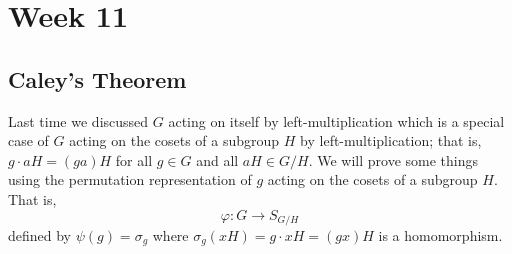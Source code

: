 \section{Week 11}

\subsection{Caley's Theorem}

Last time we discussed \( G  \) acting on itself by left-multiplication which is a special case of \( G  \) acting on the cosets of a subgroup \( H  \) by left-multiplication; that is, \( g \cdot aH  = (ga)H \) for all \( g \in G  \) and all \( a H  \in G/ H   \). We will prove some things using the permutation representation of \( g  \) acting on the cosets of a subgroup \( H \). That is, 
\[  \varphi : G \to {S}_{G / H } \]
defined by \( \psi(g) = \sigma_{g} \) where \( {\sigma}_{g}(xH) = g \cdot xH =  (gx)H  \) is a homomorphism. 

